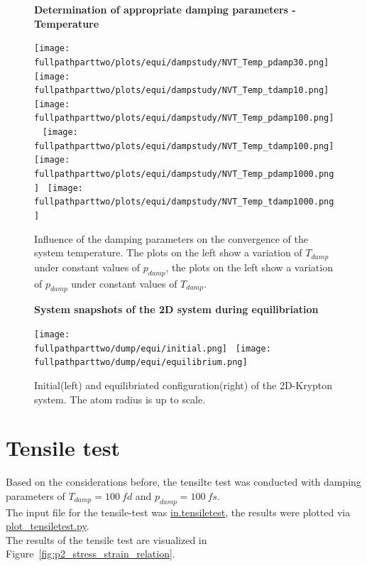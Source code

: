 \documentclass[10pt,a4paper]{report}
\def \pathparttwo {../../2_Two-dimensional_atomic_tensile_test}
\def \fullpathparttwo {/home/lukas/Desktop/project/independence/atomistic_modeling/exam/2_Two-dimensional_atomic_tensile_test}
\newcommand*{\figuretitle}[1]{%
    {\centering%
    \textbf{#1}%
    \par\medskip}%
}
\begin{document}
\begin{center}
\begin{figure}[h]
\figuretitle{Determination of appropriate damping parameters - Temperature}
\texttt{[image: \\fullpathparttwo/plots/equi/dampstudy/NVT\_Temp\_pdamp30.png]}~
\texttt{[image: \\fullpathparttwo/plots/equi/dampstudy/NVT\_Temp\_tdamp10.png]}
\texttt{[image: \\fullpathparttwo/plots/equi/dampstudy/NVT\_Temp\_pdamp100.png]}~
\texttt{[image: \\fullpathparttwo/plots/equi/dampstudy/NVT\_Temp\_tdamp100.png]}
\texttt{[image: \\fullpathparttwo/plots/equi/dampstudy/NVT\_Temp\_pdamp1000.png]}~
\texttt{[image: \\fullpathparttwo/plots/equi/dampstudy/NVT\_Temp\_tdamp1000.png]}
\caption[Determination of appropriate damping parameters - Temperature]{Influence of the damping parameters on the convergence of the system temperature. The plots on the left show a variation of $T_{damp}$ under constant values of $p_{damp}$, the plots on the left show a variation of $p_{damp}$ under constant values of $T_{damp}$.}
\label{fig:p2_dampstudy_PotEng}
\end{figure}
\end{center}


\begin{center}
\begin{figure}[h]
\figuretitle{System snapshots of the 2D system during equilibriation}
\texttt{[image: \\fullpathparttwo/dump/equi/initial.png]}~
\texttt{[image: \\fullpathparttwo/dump/equi/equilibrium.png]}
\caption[System snapshots of the 2D system during equilibriation]{Initial(left) and equilibriated configuration(right) of the 2D-Krypton system. The atom radius is up to scale.}
\label{fig:p2_equi_ovito}
\end{figure}
\end{center}



\section{Tensile test}
Based on the considerations before, the tensilte test was conducted with damping parameters of $T_{damp}=100~fd$ and $p_{damp}=100~fs$.\\
The input file for the tensile-test was \href{\pathparttwo/in.tensiletest}{in.tensiletest}, the results were plotted via \href{\pathparttwo/plot_tensiletest.py}{plot\_tensiletest.py}.\\
The results of the tensile test are visualized in Figure~\ref{fig:p2_stress_strain_relation}.
\end{document}
